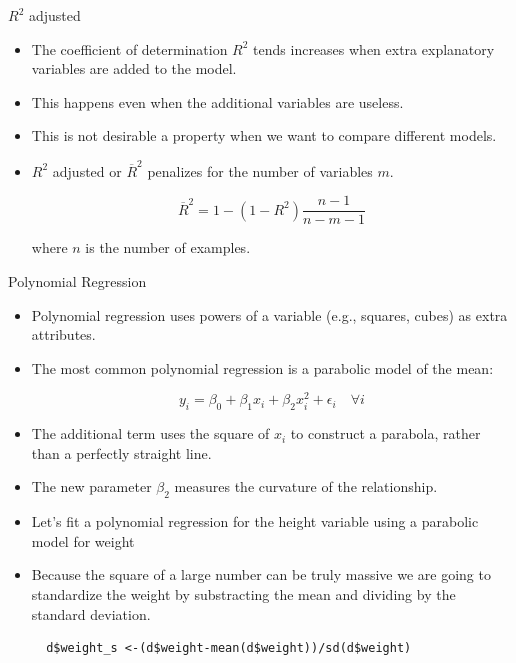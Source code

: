 \documentclass[handout]{beamer}
\begin{document}
\begin{frame}{$R^2$ adjusted}
 \scriptsize{
 \begin{itemize}
  \item The coefficient of determination $R^2$ tends increases when extra explanatory variables are added to the model.
  
  \item This happens even when the additional variables are useless.
  
  \item This is not desirable a property  when we want to compare different models.

\item $R^2$ adjusted or $\overline{R}^2$ penalizes for the number of variables $m$.
 
\begin{displaymath}
 \overline{R}^2= 1-(1-R^2)\frac{n-1}{n-m-1}
\end{displaymath}

where $n$ is the number of examples.

 \end{itemize}
 }
\end{frame}

\begin{frame}[fragile]{Polynomial Regression}
\scriptsize{ 
\begin{itemize}
 \item Polynomial regression uses powers of a variable (e.g., squares, cubes) as extra attributes.
 
 \item The most common polynomial regression is a parabolic model of the mean:
 
 \begin{displaymath}
 y_i=\beta_{0}+\beta_{1}x_i + \beta_{2}x_i^2 + \epsilon_i \quad \forall i
\end{displaymath}
 
 \item The additional term uses the square of $x_i$ to construct a parabola, rather than a perfectly straight line. 
 
 \item The new parameter $\beta_2$ measures the curvature of the relationship.
 
 
 \item Let's fit a polynomial regression for the height variable using a parabolic model for weight
 
  \item Because the square of a large number can be truly massive we are going to standardize the weight by substracting the mean and dividing by the standard deviation.
 
 \begin{verbatim}
  d$weight_s <-(d$weight-mean(d$weight))/sd(d$weight)
 \end{verbatim}

 
 
\end{itemize}


}
\end{frame}
\end{document}
